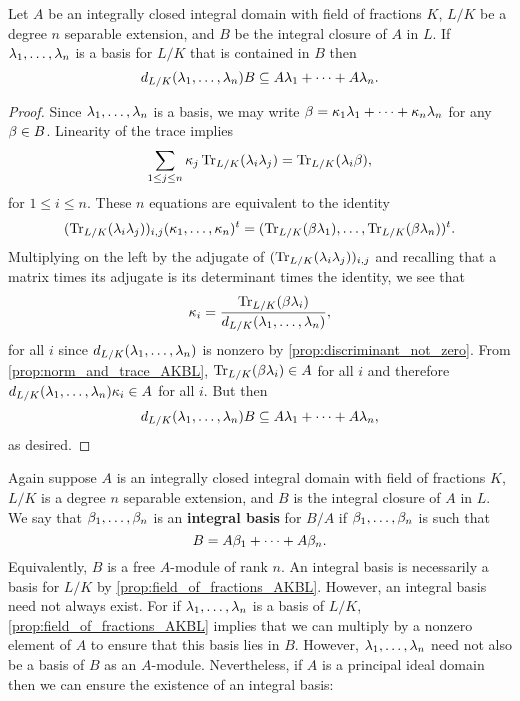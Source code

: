     \begin{lemma}\label{lem:lemma_for_integral_basis_AKBL}
      Let $A$ be an integrally closed integral domain with field of fractions $K$, $L/K$ be a degree $n$ separable extension, and $B$ be the integral closure of $A$ in $L$. If $\lambda_{1},\ldots,\lambda_{n}$ is a basis for $L/K$ that is contained in $B$ then
      \[
        d_{L/K}(\lambda_{1},\ldots,\lambda_{n})B \subseteq A\lambda_{1}+\cdots+A\lambda_{n}.
      \]
    \end{lemma}
    \begin{proof}
      Since $\lambda_{1},\ldots,\lambda_{n}$ is a basis, we may write $\beta = \kappa_{1}\lambda_{1}+\cdots+\kappa_{n}\lambda_{n}$ for any $\beta \in B$. Linearity of the trace implies
      \[
        \sum_{1 \le j \le n}\kappa_{j}\operatorname{\mathrm{Tr}}_{L/K}(\lambda_{i}\lambda_{j}) = \operatorname{\mathrm{Tr}}_{L/K}(\lambda_{i}\beta),
      \]
      for $1 \le i \le n$. These $n$ equations are equivalent to the identity
      \[
        (\operatorname{\mathrm{Tr}}_{L/K}(\lambda_{i}\lambda_{j}))_{i,j}(\kappa_{1},\ldots,\kappa_{n})^{t} = (\operatorname{\mathrm{Tr}}_{L/K}(\beta\lambda_{1}),\ldots,\operatorname{\mathrm{Tr}}_{L/K}(\beta\lambda_{n}))^{t}.
      \]
      Multiplying on the left by the adjugate of $(\operatorname{\mathrm{Tr}}_{L/K}(\lambda_{i}\lambda_{j}))_{i,j}$ and recalling that a matrix times its adjugate is its determinant times the identity, we see that
      \[
        \kappa_{i} = \frac{\operatorname{\mathrm{Tr}}_{L/K}(\beta\lambda_{i})}{d_{L/K}(\lambda_{1},\ldots,\lambda_{n})},
      \]
      for all $i$ since $d_{L/K}(\lambda_{1},\ldots,\lambda_{n})$ is nonzero by \cref{prop:discriminant_not_zero}. From \cref{prop:norm_and_trace_AKBL}, $\operatorname{\mathrm{Tr}}_{L/K}(\beta\lambda_{i}) \in A$ for all $i$ and therefore $d_{L/K}(\lambda_{1},\ldots,\lambda_{n})\kappa_{i} \in A$ for all $i$. But then
      \[
        d_{L/K}(\lambda_{1},\ldots,\lambda_{n})B \subseteq A\lambda_{1}+\cdots+A\lambda_{n},
      \]
      as desired.
    \end{proof}

    Again suppose $A$ is an integrally closed integral domain with field of fractions $K$, $L/K$ is a degree $n$ separable extension, and $B$ is the integral closure of $A$ in $L$. We say that $\beta_{1},\ldots,\beta_{n}$ is an \textbf{integral basis} for $B/A$ if $\beta_{1},\ldots,\beta_{n}$ is such that
    \[
      B = A\beta_{1}+\cdots+A\beta_{n}.
    \]
    Equivalently, $B$ is a free $A$-module of rank $n$. An integral basis is necessarily a basis for $L/K$ by \cref{prop:field_of_fractions_AKBL}. However, an integral basis need not always exist. For if $\lambda_{1},\ldots,\lambda_{n}$ is a basis of $L/K$, \cref{prop:field_of_fractions_AKBL} implies that we can multiply by a nonzero element of $A$ to ensure that this basis lies in $B$. However, $\lambda_{1},\ldots,\lambda_{n}$ need not also be a basis of $B$ as an $A$-module. Nevertheless, if $A$ is a principal ideal domain then we can ensure the existence of an integral basis:
    
